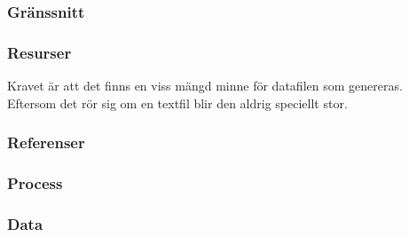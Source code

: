 \subsubsection{Gränssnitt}

\subsubsection{Resurser}
Kravet är att det finns en viss mängd minne för datafilen som genereras. Eftersom det rör sig om en textfil blir den aldrig speciellt stor.
\subsubsection{Referenser}

\subsubsection{Process}

\subsubsection{Data}
